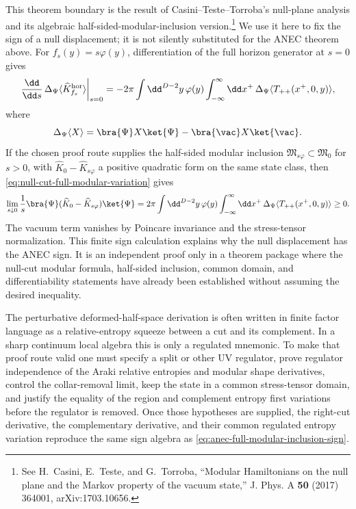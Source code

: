 This theorem boundary is the result of Casini--Teste--Torroba's null-plane
analysis and its algebraic half-sided-modular-inclusion version.\footnote{See
H.~Casini, E.~Teste, and G.~Torroba, ``Modular Hamiltonians on the null plane
and the Markov property of the vacuum state,'' J. Phys. A \textbf{50} (2017)
364001, arXiv:1703.10656.}  We use it here to fix the sign of a null
displacement; it is not silently substituted for the ANEC theorem above.
For \(f_s(y)=s\varphi(y)\), differentiation of the full horizon generator at
\(s=0\) gives
\begin{equation}
  \frac{\dd}{\dd s}\,
  \Delta_\Psi\langle \widehat K_{f_s}^{\rm hor}\rangle\bigg|_{s=0}
  =
  -2\pi
  \int\dd^{D-2}y\,\varphi(y)
  \int_{-\infty}^{\infty}\dd x^+\,
  \Delta_\Psi\langle T_{++}(x^+,0,y)\rangle,
  \label{eq:null-cut-full-modular-variation}
\end{equation}
where
\[
  \Delta_\Psi\langle X\rangle
  =
  \bra{\Psi}X\ket{\Psi}-\bra{\vac}X\ket{\vac}.
\]
If the chosen proof route supplies the half-sided modular inclusion
\(\mathfrak M_{s\varphi}\subset\mathfrak M_0\) for \(s>0\), with
\(\widehat K_0-\widehat K_{s\varphi}\) a positive quadratic form on the same
state class, then \eqref{eq:null-cut-full-modular-variation} gives
\begin{equation}
  \lim_{s\downarrow0}
  \frac{1}{s}
  \bra{\Psi}(\widehat K_0-\widehat K_{s\varphi})\ket{\Psi}
  =
  2\pi
  \int\dd^{D-2}y\,\varphi(y)
  \int_{-\infty}^{\infty}\dd x^+\,
  \Delta_\Psi\langle T_{++}(x^+,0,y)\rangle
  \geq0.
  \label{eq:anec-full-modular-inclusion-sign}
\end{equation}
The vacuum term vanishes by Poincare invariance and the stress-tensor
normalization.  This finite sign calculation explains why the null displacement
has the ANEC sign.  It is an independent proof only in a theorem package where
the null-cut modular formula, half-sided inclusion, common domain, and
differentiability statements have already been established without assuming
the desired inequality.

The perturbative deformed-half-space derivation is often written in finite
factor language as a relative-entropy squeeze between a cut and its
complement.  In a sharp continuum local algebra this is only a regulated
mnemonic.  To make that proof route valid one must specify a split or other
UV regulator, prove regulator independence of the Araki relative entropies and
modular shape derivatives, control the collar-removal limit, keep the state in
a common stress-tensor domain, and justify the equality of the region and
complement entropy first variations before the regulator is removed.  Once
those hypotheses are supplied, the right-cut derivative, the complementary
derivative, and their common regulated entropy variation reproduce the same
sign algebra as \eqref{eq:anec-full-modular-inclusion-sign}.


